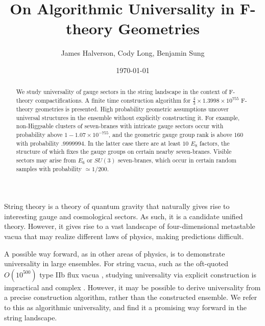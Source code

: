 \documentclass[aps,prl,twocolumn, superscriptaddress,groupedaddress,nofootinbib]{revtex4-1}
\begin{document}
\title{On Algorithmic Universality in F-theory Geometries}
\author{James Halverson, Cody Long, Benjamin Sung}

\date{\today}

\begin{abstract}
We study universality of gauge sectors in the string landscape
in the context of F-theory compactifications.
A finite time construction algorithm for $\frac43 \times 1.3998 \times 10^{755}$ F-theory geometries is presented. High probability geometric
assumptions uncover universal structures in the ensemble without
explicitly constructing it. For example, non-Higgsable clusters
of seven-branes with intricate gauge sectors occur with
probability above $1-1.07\times 10^{-755}$,  and
the geometric gauge group rank is above $160$ with probability
$.9999994$. In the latter case there are at least $10$ $E_8$
factors, the structure of which fixes the gauge groups
on certain nearby seven-branes. Visible sectors may arise from $E_6$ or $SU(3)$ seven-branes, which occur
in certain random samples with probability $\simeq 1/200$.
\end{abstract}

\maketitle


String theory is a theory of quantum gravity that naturally
gives rise to interesting gauge and cosmological sectors. As
such, it is a candidate unified theory. However, it gives
rise to a vast landscape of four-dimensional metastable vacua that
may realize different laws of physics, making predictions difficult.


A possible way forward, as in other areas of physics, is to demonstrate
universality in large ensembles. For string vacua, such as the oft-quoted
$O(10^{500})$ type IIb flux vacua
\cite{Bousso:2000xa,*Ashok:2003gk,*Denef:2004ze}, studying universality via
explicit construction is impractical and complex
\cite{Denef:2006ad,*Cvetic:2010ky}. However, it may be possible to derive
universality from a precise construction algorithm, rather than the
constructed ensemble. We refer to this as algorithmic universality, and find it a
promising way forward in the string landscape.

\end{document}
